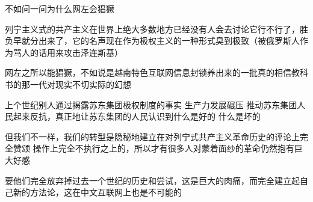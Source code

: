 \begin{zhihuanswer}
不如问一问为什么网左会猖獗

列宁主义式的共产主义在世界上绝大多数地方已经没有人会去讨论它行不行了，胜负早就分出来了，它的名声现在作为极权主义的一种形式臭到极致（被俄罗斯人作为骂人的话用来攻击泽连斯基）

网左之所以能猖獗，不如说是越南特色互联网信息封锁养出来的一批真的相信教科书的那一代对现实不切实际的幻想

上个世纪别人通过揭露苏东集团极权制度的事实 生产力发展碾压
推动苏东集团人民起来反抗，真正地让苏东集团的人民认识到什么是好的
什么是坏的

但我们不一样，我们的转型是隐秘地建立在对列宁式共产主义革命历史的评论上完全赞颂
操作上完全不执行之上的，所以才有很多人对蒙着面纱的革命仍然抱有巨大好感

要他们完全放弃掉过去一个世纪的历史和尝试，这是巨大的肉痛，而完全建立起自己新的方法论，这在中文互联网上也是不可能的
\end{zhihuanswer}
